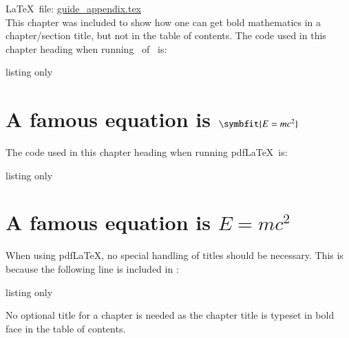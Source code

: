 

\label{sec:emc2}

\LaTeX\ file: \href{run:./guide_appendix.tex}{guide\_appendix.tex}\\[1ex]
\noindent
This chapter was included to show how one can get bold mathematics in
a chapter/section title, but not in the table of contents.
The code used in this chapter heading when running \LuaLaTeX\ of \XeLaTeX\ is:
\begin{tcblisting}{listing only}
\chapter{A famous equation is \texorpdfstring{$\symbfit{E = mc^{2}}$}{E = mc^2}}%
\end{tcblisting}
The code used in this chapter heading when running pdf\LaTeX\ is:
\begin{tcblisting}{listing only}
\chapter{A famous equation is \texorpdfstring{$E = mc^{2}$}{E = mc2}}%
\end{tcblisting}

When using pdf\LaTeX, no special handling of titles should be necessary.
This is because the following line is included in :
\begin{tcblisting}{listing only}
\def\bfseries{\fontseries\bfdefault\selectfont\boldmath}
\end{tcblisting}

No optional title for a chapter is needed as the chapter title is typeset in bold
face in the table of contents.

